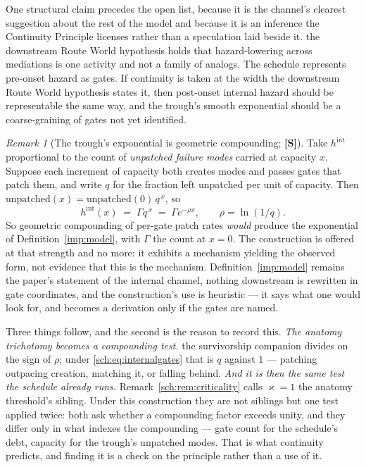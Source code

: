 \documentclass[11pt]{article}
\theoremstyle{plain}
\theoremstyle{definition}
\theoremstyle{remark}
\newtheorem{remark}[theorem]{Remark}
\begin{document}
One structural claim precedes the open list, because it is
the channel's clearest suggestion about the rest of the model and because
it is an inference the Continuity Principle licenses rather than a
speculation laid beside it. the downstream Route World hypothesis holds that hazard-lowering across
mediations is one activity and not a family of analogs. The schedule
represents pre-onset hazard as gates. If continuity is taken at the width
the downstream Route World hypothesis states it, then post-onset internal
hazard should be representable the same way, and the trough's smooth
exponential should be a coarse-graining of gates not yet identified.

\begin{remark}[The trough's exponential is geometric compounding;
\textbf{[S]}]\label{sch:rem:internalgates}
Take $h^{\mathrm{int}}$ proportional to the count of \emph{unpatched
failure modes} carried at capacity $x$. Suppose each increment of
capacity both creates modes and passes gates that patch them, and write
$q$ for the fraction left unpatched per unit of capacity. Then
$\text{unpatched}(x)=\text{unpatched}(0)\,q^{\,x}$, so
\begin{equation}\label{sch:eq:internalgates}
h^{\mathrm{int}}(x)\;=\;\Gamma q^{\,x}\;=\;\Gamma e^{-\rho x},
\qquad \rho=\ln(1/q).
\end{equation}
So geometric compounding of per-gate patch rates \emph{would} produce
the exponential of Definition~\ref{imp:model}, with $\Gamma$ the count at
$x=0$. The construction is offered at that strength and no more: it
exhibits a mechanism yielding the observed form, not evidence that this
is the mechanism. Definition~\ref{imp:model} remains the paper's statement of
the internal channel, nothing downstream is rewritten in gate
coordinates, and the construction's use is heuristic --- it says what one
would look for, and becomes a derivation only if the gates are named.

Three things follow, and the second is the reason to record this. \emph{The anatomy trichotomy becomes a compounding test.}
the survivorship companion \cite{SurvA} divides on the sign of $\rho$;
under \eqref{sch:eq:internalgates} that is $q$ against $1$ --- patching
outpacing creation, matching it, or falling behind. \emph{And it is then the same test the schedule already runs.}
Remark~\ref{sch:rem:criticality} calls $\varkappa=1$ the anatomy threshold's
sibling. Under this construction they are not siblings but one test
applied twice: both ask whether a compounding factor exceeds unity, and
they differ only in what indexes the compounding --- gate count for the
schedule's debt, capacity for the trough's unpatched modes. That is what
continuity predicts, and finding it is a check on the principle rather
than a use of it.


\end{remark}
\end{document}
